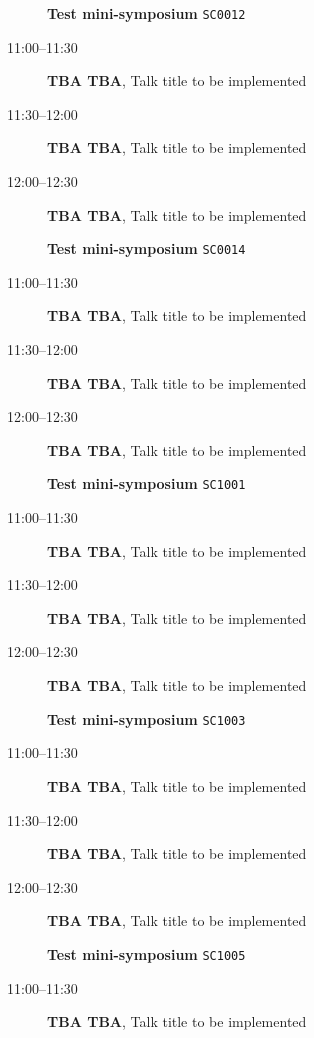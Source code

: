 \documentclass[ILAS2025-program.tex]{subfiles}
\begin{document}
\begin{description}
\begin{description}
        \end{description}
    \begin{description}
    \item[] \textbf{Test mini-symposium} {\footnotesize\texttt{SC0012}}
    \item[11:00--11:30] \textbf{TBA TBA}, Talk title to be implemented
        \item[11:30--12:00] \textbf{TBA TBA}, Talk title to be implemented
        \item[12:00--12:30] \textbf{TBA TBA}, Talk title to be implemented
        \end{description}
    \begin{description}
    \item[] \textbf{Test mini-symposium} {\footnotesize\texttt{SC0014}}
    \item[11:00--11:30] \textbf{TBA TBA}, Talk title to be implemented
        \item[11:30--12:00] \textbf{TBA TBA}, Talk title to be implemented
        \item[12:00--12:30] \textbf{TBA TBA}, Talk title to be implemented
        \end{description}
    \begin{description}
    \item[] \textbf{Test mini-symposium} {\footnotesize\texttt{SC1001}}
    \item[11:00--11:30] \textbf{TBA TBA}, Talk title to be implemented
        \item[11:30--12:00] \textbf{TBA TBA}, Talk title to be implemented
        \item[12:00--12:30] \textbf{TBA TBA}, Talk title to be implemented
        \end{description}
    \begin{description}
    \item[] \textbf{Test mini-symposium} {\footnotesize\texttt{SC1003}}
    \item[11:00--11:30] \textbf{TBA TBA}, Talk title to be implemented
        \item[11:30--12:00] \textbf{TBA TBA}, Talk title to be implemented
        \item[12:00--12:30] \textbf{TBA TBA}, Talk title to be implemented
        \end{description}
    \begin{description}
    \item[] \textbf{Test mini-symposium} {\footnotesize\texttt{SC1005}}
    \item[11:00--11:30] \textbf{TBA TBA}, Talk title to be implemented

\end{description}
\end{description}
\end{document}
